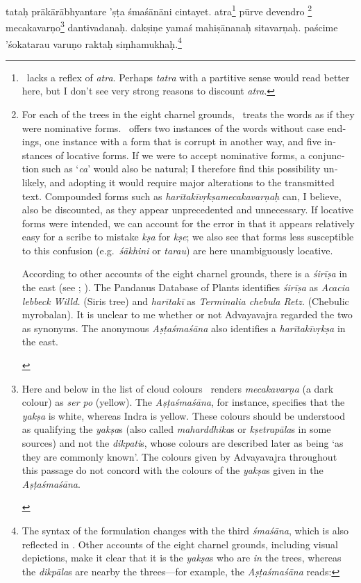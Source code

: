 \documentclass[naipra.tex]{subfiles}
\begin{document}
\begin{sanskrit}
\pstart
tataḥ prākārābhyantare 'ṣṭa śmaśānāni cintayet.
atra\footnote{
	\TIB\ lacks a reflex of \emph{atra}.
	Perhaps \emph{tatra} with a partitive sense would read better here, but I don't see very strong reasons to discount \emph{atra}.
} pūrve devendro \footnote{\begin{english}
	For each of the trees in the eight charnel grounds, \TIB\ treats the words as if they were nominative forms.
	\MSN\ offers two instances of the words without case endings, one instance with a form that is corrupt in another way, and five instances of locative forms.
	If we were to accept nominative forms, a conjunction such as `\emph{ca}' would also be natural; I therefore find this possibility unlikely, and adopting it would require major alterations to the transmitted text. 
	Compounded forms such as \emph{harītakīvṛkṣamecakavarṇaḥ} can, I believe, also be discounted, as they appear unprecedented and unnecessary.
	If locative forms were intended, we can account for the error in that it appears relatively easy for a scribe to mistake \emph{kṣa} for \emph{kṣe}; we also see that forms less susceptible to this confusion (e.g.\ \emph{śākhini} or \emph{tarau}) are here unambiguously locative. 

	According to other accounts of the eight charnel grounds, there is a \emph{śirīṣa} in the east (see \cite[vol.\ 2 739–740]{gerloff2020}; \cite[140]{english2002}).
	The Pandanus Database of Plants identifies \emph{śirīṣa} as \emph{Acacia lebbeck Willd.} (Siris tree) and \emph{harītakī} as \emph{Terminalia chebula Retz.} (Chebulic myrobalan).
	It is unclear to me whether or not Advayavajra regarded the two as synonyms.
	The anonymous \emph{Aṣṭaśmaśāna} also identifies a \emph{harītakīvṛkṣa} in the east.
\end{english}} mecakavarṇo\footnote{
	\begin{english}%
		Here and below in the list of cloud colours \TIB\ renders \emph{mecakavarṇa} (a dark colour) as \emph{ser po} (yellow).
		The \emph{Aṣṭaśmaśāna}, for instance, specifies that the \emph{yakṣa} is white, whereas Indra is yellow.
		These colours should be understood as qualifying the \emph{yakṣa}s (also called \emph{maharddhika}s or \emph{kṣetrapāla}s in some sources) and not the \emph{dikpati}s, whose colours are described later as being `as they are commonly known'.
		The colours given by Advayavajra throughout this passage do not concord with the colours of the \emph{yakṣa}s given in the \emph{Aṣṭaśmaśāna}.
	\end{english}
} dantivadanaḥ.
dakṣiṇe yamaś  mahiṣānanaḥ sitavarṇaḥ.
paścime 'śokatarau varuṇo raktaḥ siṃhamukhaḥ.\footnote{
	The syntax of the formulation changes with the third \emph{śmaśāna}, which is also reflected in \TIB .
	Other accounts of the eight charnel grounds, including visual depictions, make it clear that it is the \emph{yakṣa}s who are \emph{in} the trees, whereas the \emph{dikpāla}s are nearby the threes—for example, the \emph{Aṣṭaśmaśāna} reads:

}
\end{sanskrit}
\end{document}
